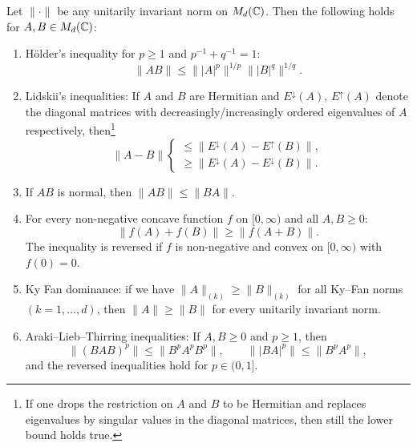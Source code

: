 \documentclass[11pt,a4paper]{article}
\theoremstyle{plain}
\theoremstyle{definition}
\theoremstyle{remark}
\begin{document}
\begin{theorem}
    Let $\|\cdot\|$ be any unitarily invariant norm on $M_d(\mathbb{C})$. Then the following holds for $A,B\in M_d(\mathbb{C})$:
    \begin{enumerate}
        \item H\"older's inequality for $p\ge 1$ and $p^{-1}+q^{-1}=1$:
              \begin{equation}\tag{8.2}
                  \|AB\| \le \bigl\||A|^p\bigr\|^{1/p} \bigl\||B|^q\bigr\|^{1/q}.
              \end{equation}

        \item Lidskii's inequalities: If $A$ and $B$ are Hermitian and $E^{\downarrow}(A)$, $E^{\uparrow}(A)$ denote
              the diagonal matrices with decreasingly/increasingly ordered eigenvalues of $A$ respectively, then\footnote{If one drops the restriction on $A$ and $B$ to be Hermitian and replaces eigenvalues by
                  singular values in the diagonal matrices, then still the lower bound holds true.}
              \begin{equation}\tag{8.3}
                  \|A-B\|
                  \begin{cases}
                      \le \bigl\|E^{\downarrow}(A)-E^{\uparrow}(B)\bigr\|, \\[0.3em]
                      \ge \bigl\|E^{\downarrow}(A)-E^{\downarrow}(B)\bigr\|.
                  \end{cases}
              \end{equation}

        \item If $AB$ is normal, then $\|AB\|\le \|BA\|$.

        \item For every non-negative concave function $f$ on $[0,\infty)$ and all $A,B\ge 0$:
              \begin{equation}\tag{8.4}
                  \|f(A)+f(B)\| \ge \|f(A+B)\|.
              \end{equation}
              The inequality is reversed if $f$ is non-negative and convex on $[0,\infty)$ with $f(0)=0$.

        \item Ky Fan dominance: if we have $\|A\|_{(k)}\ge \|B\|_{(k)}$ for all Ky--Fan norms
              $(k=1,\dots,d)$, then $\|A\|\ge \|B\|$ for every unitarily invariant norm.

        \item Araki--Lieb--Thirring inequalities: If $A,B\ge 0$ and $p\ge 1$, then
              \begin{equation}\tag{8.5}
                  \bigl\|(BAB)^p\bigr\| \le \|B^pA^pB^p\|,\qquad \bigl\||BA|^p\bigr\| \le \|B^pA^p\|,
              \end{equation}
              and the reversed inequalities hold for $p\in(0,1]$.
    \end{enumerate}
\end{theorem}
\end{document}
